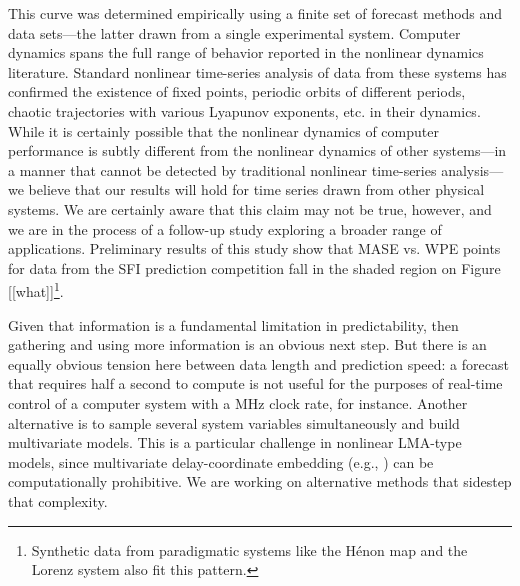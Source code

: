 This curve was determined empirically using a finite set of forecast
methods and data sets---the latter drawn from a single experimental
system.  Computer dynamics spans the full range of behavior reported
in the nonlinear dynamics literature.  Standard nonlinear time-series
analysis of data from these systems has confirmed the existence of
fixed points, periodic orbits of different periods, chaotic
trajectories with various Lyapunov exponents, etc. in their dynamics.
While it is certainly possible that the nonlinear dynamics of computer
performance is subtly different from the nonlinear dynamics of other
systems---in a manner that cannot be detected by traditional nonlinear
time-series analysis---we believe that our results will hold for time
series drawn from other physical systems.  We are certainly aware that
this claim may not be true, however, and we are in the process of a
follow-up study exploring a broader range of applications.
Preliminary results of this study show that MASE vs. WPE points for
data from the SFI prediction competition \cite{weigend-book} fall in the shaded
region on Figure [[what]]\footnote{Synthetic data from paradigmatic
  systems like the H\'{e}non map \cite{henon} and the Lorenz system
  \cite{lorenz} also fit this pattern.}.

Given that information is a fundamental limitation in predictability,
then gathering and using more information is an obvious next step.
But there is an equally obvious tension here between data length and
prediction speed: a forecast that requires half a second to compute is
not useful for the purposes of real-time control of a computer system
with a MHz clock rate, for instance.  Another alternative is to sample
several system variables simultaneously and build multivariate models.
This is a particular challenge in nonlinear LMA-type models, since
multivariate delay-coordinate embedding (e.g.,
\cite{cao-multivariate-embedding,deyle-sugihara2011}) can be
computationally prohibitive.  We are working on alternative methods
that sidestep that complexity.


